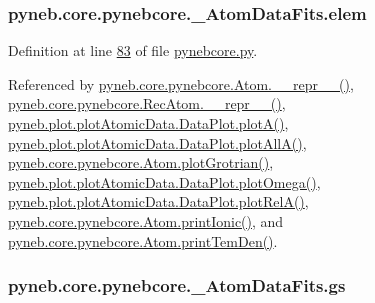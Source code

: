 \hypertarget{classpyneb_1_1core_1_1pynebcore_1_1___atom_data_fits_a4724ac766d9c28d48fdcf43f50bd8478}{}
\subsubsection[{elem}]{\setlength{\rightskip}{0pt plus 5cm}pyneb.\+core.\+pynebcore.\+\_\+\+Atom\+Data\+Fits.\+elem}\label{classpyneb_1_1core_1_1pynebcore_1_1___atom_data_fits_a4724ac766d9c28d48fdcf43f50bd8478}


Definition at line \hyperlink{pynebcore_8py_source_l00083}{83} of file \hyperlink{pynebcore_8py_source}{pynebcore.\+py}.



Referenced by \hyperlink{pynebcore_8py_source_l02544}{pyneb.\+core.\+pynebcore.\+Atom.\+\_\+\+\_\+repr\+\_\+\+\_\+()}, \hyperlink{pynebcore_8py_source_l03032}{pyneb.\+core.\+pynebcore.\+Rec\+Atom.\+\_\+\+\_\+repr\+\_\+\+\_\+()}, \hyperlink{plot_atomic_data_8py_source_l00116}{pyneb.\+plot.\+plot\+Atomic\+Data.\+Data\+Plot.\+plot\+A()}, \hyperlink{plot_atomic_data_8py_source_l00188}{pyneb.\+plot.\+plot\+Atomic\+Data.\+Data\+Plot.\+plot\+All\+A()}, \hyperlink{pynebcore_8py_source_l02372}{pyneb.\+core.\+pynebcore.\+Atom.\+plot\+Grotrian()}, \hyperlink{plot_atomic_data_8py_source_l00372}{pyneb.\+plot.\+plot\+Atomic\+Data.\+Data\+Plot.\+plot\+Omega()}, \hyperlink{plot_atomic_data_8py_source_l00261}{pyneb.\+plot.\+plot\+Atomic\+Data.\+Data\+Plot.\+plot\+Rel\+A()}, \hyperlink{pynebcore_8py_source_l02167}{pyneb.\+core.\+pynebcore.\+Atom.\+print\+Ionic()}, and \hyperlink{pynebcore_8py_source_l02253}{pyneb.\+core.\+pynebcore.\+Atom.\+print\+Tem\+Den()}.

\hypertarget{classpyneb_1_1core_1_1pynebcore_1_1___atom_data_fits_ae8ab3604ecbf05c1f668717fc13e9dc2}{}
\subsubsection[{gs}]{\setlength{\rightskip}{0pt plus 5cm}pyneb.\+core.\+pynebcore.\+\_\+\+Atom\+Data\+Fits.\+gs}\label{classpyneb_1_1core_1_1pynebcore_1_1___atom_data_fits_ae8ab3604ecbf05c1f668717fc13e9dc2}


